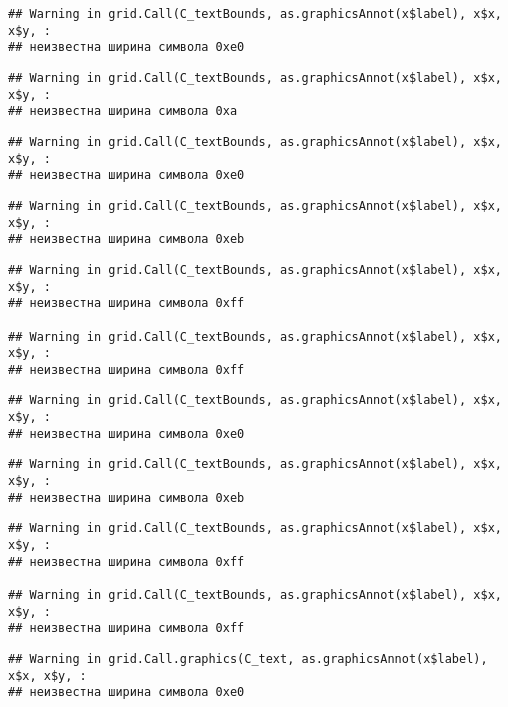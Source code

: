 \documentclass[
]{article}
\begin{document}
\begin{verbatim}
## Warning in grid.Call(C_textBounds, as.graphicsAnnot(x$label), x$x, x$y, :
## неизвестна ширина символа 0xe0
\end{verbatim}

\begin{verbatim}
## Warning in grid.Call(C_textBounds, as.graphicsAnnot(x$label), x$x, x$y, :
## неизвестна ширина символа 0xa
\end{verbatim}

\begin{verbatim}
## Warning in grid.Call(C_textBounds, as.graphicsAnnot(x$label), x$x, x$y, :
## неизвестна ширина символа 0xe0
\end{verbatim}

\begin{verbatim}
## Warning in grid.Call(C_textBounds, as.graphicsAnnot(x$label), x$x, x$y, :
## неизвестна ширина символа 0xeb
\end{verbatim}

\begin{verbatim}
## Warning in grid.Call(C_textBounds, as.graphicsAnnot(x$label), x$x, x$y, :
## неизвестна ширина символа 0xff

## Warning in grid.Call(C_textBounds, as.graphicsAnnot(x$label), x$x, x$y, :
## неизвестна ширина символа 0xff
\end{verbatim}

\begin{verbatim}
## Warning in grid.Call(C_textBounds, as.graphicsAnnot(x$label), x$x, x$y, :
## неизвестна ширина символа 0xe0
\end{verbatim}

\begin{verbatim}
## Warning in grid.Call(C_textBounds, as.graphicsAnnot(x$label), x$x, x$y, :
## неизвестна ширина символа 0xeb
\end{verbatim}

\begin{verbatim}
## Warning in grid.Call(C_textBounds, as.graphicsAnnot(x$label), x$x, x$y, :
## неизвестна ширина символа 0xff

## Warning in grid.Call(C_textBounds, as.graphicsAnnot(x$label), x$x, x$y, :
## неизвестна ширина символа 0xff
\end{verbatim}

\begin{verbatim}
## Warning in grid.Call.graphics(C_text, as.graphicsAnnot(x$label), x$x, x$y, :
## неизвестна ширина символа 0xe0
\end{verbatim}
\end{document}
